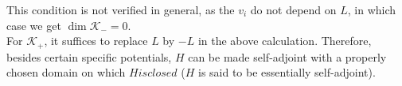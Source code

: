 This condition is not verified in general, as the $v_i$ do not depend on $L$, in which case we get $\dim \mathcal{K}_- = 0$. \\
For $\mathcal{K}_+$, it suffices to replace $L$ by $-L$ in the above calculation. Therefore, besides certain specific potentials, $H$ can be made self-adjoint with a properly chosen domain on which $H is closed$ ($H$ is said to be essentially self-adjoint).

















